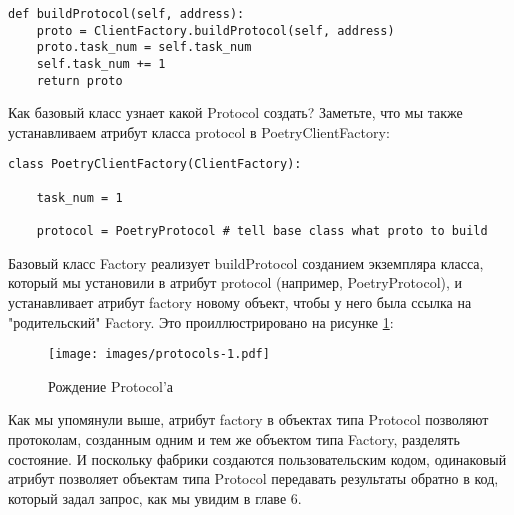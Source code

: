  \begin{verbatim}
def buildProtocol(self, address):
    proto = ClientFactory.buildProtocol(self, address)
    proto.task_num = self.task_num
    self.task_num += 1
    return proto
\end{verbatim} 


Как базовый класс узнает какой Protocol создать? Заметьте, что 
мы также устанавливаем атрибут класса protocol в PoetryClientFactory:

 \begin{verbatim}
class PoetryClientFactory(ClientFactory):

    task_num = 1

    protocol = PoetryProtocol # tell base class what proto to build
\end{verbatim} 


Базовый класс Factory реализует buildProtocol 
созданием экземпляра класса, который мы установили в 
атрибут protocol (например, PoetryProtocol), и 
устанавливает атрибут factory новому объект, чтобы 
у него была ссылка на "родительский" Factory. Это проиллюстрировано 
на рисунке \ref{fig:protocols-1}:  

\begin{figure}[h]
\begin{center}
    \texttt{[image: images/protocols-1.pdf]}
    \caption{Рождение Protocol'а\label{fig:protocols-1}}
\end{center}
\end{figure}



Как мы упомянули выше, атрибут factory в объектах 
типа Protocol позволяют протоколам, созданным одним 
и тем же объектом типа Factory, разделять состояние. И 
поскольку фабрики создаются пользовательским кодом, 
одинаковый атрибут позволяет объектам типа Protocol 
передавать результаты обратно в код, который задал запрос,  
как мы увидим в главе 6. 


